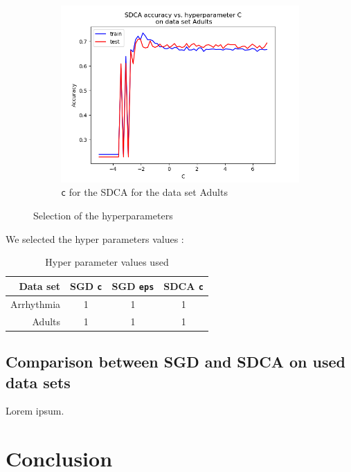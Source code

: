 \documentclass{article}
\begin{document}
\begin{figure}[H]
\begin{subfigure}[t]{0.45\linewidth}
		\includegraphics[width=\linewidth]{figs/hyperparams/adults_sdca_c.png}
		\caption{\texttt{c} for the SDCA for the data set Adults}
	\end{subfigure}
	\caption{Selection of the hyperparameters}
\end{figure}

We selected the hyper parameters values :

\begin{table}[H]
	\centering
	\begin{tabular}{rccc}
		\toprule
		Data set & SGD \texttt{c} & SGD \texttt{eps} & SDCA \texttt{c}\\
		\midrule
		Arrhythmia & 1 & 1 & 1\\
		Adults & 1 & 1 & 1\\
		\bottomrule
	\end{tabular}
	\caption{Hyper parameter values used}
\end{table}

\subsection{Comparison between SGD and SDCA on used data sets}

Lorem ipsum.


\section*{Conclusion}
\end{document}
